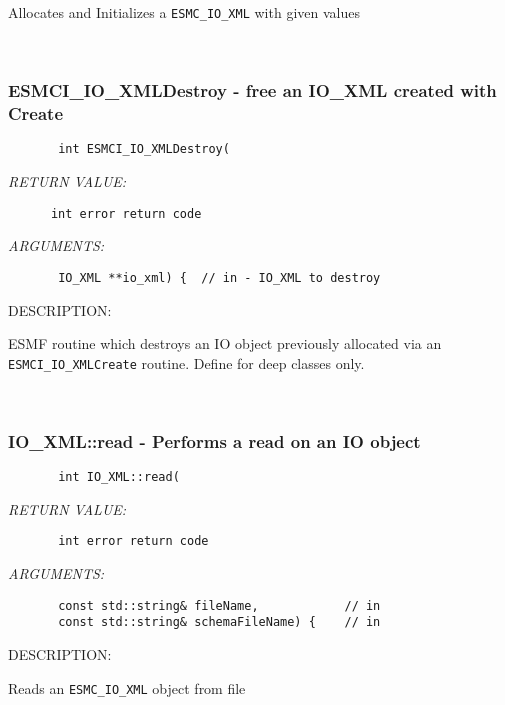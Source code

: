         Allocates and Initializes a {\tt ESMC\_IO\_XML} with given values
   
 
\mbox{}\hrulefill\ 
 
\subsubsection [ESMCI\_IO\_XMLDestroy] {ESMCI\_IO\_XMLDestroy - free an IO\_XML created with Create}


  
\begin{verbatim}       int ESMCI_IO_XMLDestroy(\end{verbatim}{\em RETURN VALUE:}
\begin{verbatim}      int error return code\end{verbatim}{\em ARGUMENTS:}
\begin{verbatim}       IO_XML **io_xml) {  // in - IO_XML to destroy\end{verbatim}
{\sf DESCRIPTION:\\ }


        ESMF routine which destroys an IO object previously allocated
        via an {\tt ESMCI\_IO\_XMLCreate} routine. Define for deep classes only.
   
 
\mbox{}\hrulefill\ 
 
\subsubsection [IO\_XML::read] {IO\_XML::read - Performs a read on an IO object}


  
\begin{verbatim}       int IO_XML::read(\end{verbatim}{\em RETURN VALUE:}
\begin{verbatim}       int error return code\end{verbatim}{\em ARGUMENTS:}
\begin{verbatim}       const std::string& fileName,            // in
       const std::string& schemaFileName) {    // in
 \end{verbatim}
{\sf DESCRIPTION:\\ }


        Reads an {\tt ESMC\_IO\_XML} object from file
   
